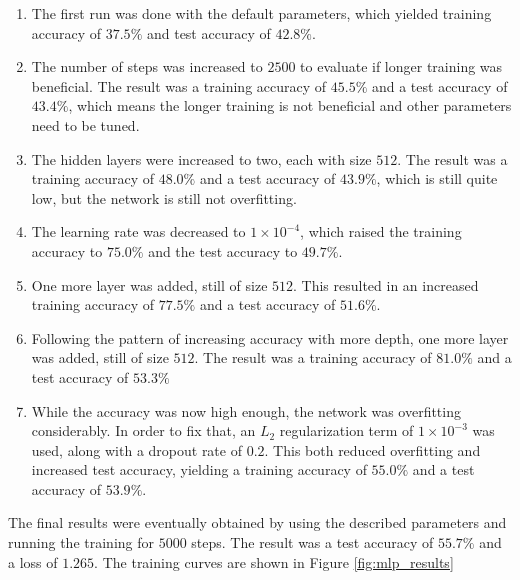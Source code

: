 \documentclass{article}
\begin{document}
\begin{enumerate}[(1)]
  \item The first run was done with the default parameters, which yielded training accuracy of $37.5 \%$ and test accuracy of $42.8 \%$.

  \item The number of steps was increased to $2500$ to evaluate if longer training was beneficial. The result was a training accuracy of $45.5 \%$ and a test accuracy of $43.4 \%$, which means the longer training is not beneficial and other parameters need to be tuned.

  \item The hidden layers were increased to two, each with size $512$. The result was a training accuracy of $48.0 \%$ and a test accuracy of $43.9 \%$, which is still quite low, but the network is still not overfitting.

  \item The learning rate was decreased to $1 \times 10^{-4}$, which raised the training accuracy to $75.0 \%$ and the test accuracy to $49.7 \%$.

  \item One more layer was added, still of size $512$. This resulted in an increased training accuracy of $77.5 \%$ and a test accuracy of $51.6 \%$.

  \item Following the pattern of increasing accuracy with more depth, one more layer was added, still of size $512$. The result was a training accuracy of $81.0 \%$ and a test accuracy of $53.3 \%$

  \item While the accuracy was now high enough, the network was overfitting considerably. In order to fix that, an $L_2$ regularization term of $1 \times 10^{-3}$ was used, along with a dropout rate of $0.2$. This both reduced overfitting and increased test accuracy, yielding a training accuracy of $55.0 \%$ and a test accuracy of $53.9 \%$.
\end{enumerate}

The final results were eventually obtained by using the described parameters and running the training for $5000$ steps. The result was a test accuracy of $55.7 \%$ and a loss of $1.265$. The training curves are shown in Figure \ref{fig:mlp_results}
\end{document}
